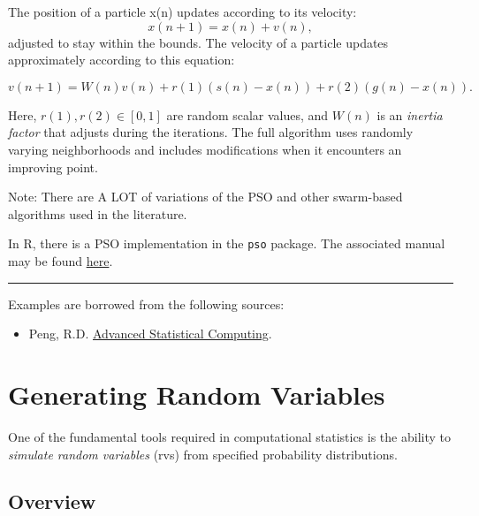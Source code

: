 \documentclass[
  letterpaper,
  DIV=11,
  numbers=noendperiod]{scrreprt}
\providecommand{\tightlist}{%
  \setlength{\itemsep}{0pt}\setlength{\parskip}{0pt}}
\begin{document}
The position of a particle x(n) updates according to its velocity:
\[x(n+1)=x(n)+v(n),\] adjusted to stay within the bounds. The velocity
of a particle updates approximately according to this equation:

\[v(n+1) = W(n)v(n)+r(1)(s(n)−x(n))+r(2)(g(n)−x(n)).\]

Here, \(r(1),r(2) \in [0,1]\) are random scalar values, and \(W(n)\) is
an \emph{inertia factor} that adjusts during the iterations. The full
algorithm uses randomly varying neighborhoods and includes modifications
when it encounters an improving point.

Note: There are A LOT of variations of the PSO and other swarm-based
algorithms used in the literature.

In R, there is a PSO implementation in the \texttt{pso} package. The
associated manual may be found
\href{https://cran.r-project.org/web/packages/pso/pso.pdf}{here}.

\begin{center}\rule{0.5\linewidth}{0.5pt}\end{center}

Examples are borrowed from the following sources:

\begin{itemize}
\tightlist
\item
  Peng, R.D. \href{https://bookdown.org/rdpeng/advstatcomp/}{Advanced
  Statistical Computing}.
\end{itemize}


\chapter{Generating Random Variables}\label{generating-random-variables}

\newcommand{\unif}{\operatorname{Unif}}
\newcommand{\geom}{\operatorname{Geom}}
\newcommand{\beta}{\operatorname{Beta}}
\newcommand{\bern}{\operatorname{Bern}}
\newcommand{\R}{\mathbb{R}}
\newcommand{\iid}{\overset{iid}{\sim}}
\newcommand{\cov}{\mathbb{C}ov}

One of the fundamental tools required in computational statistics is the
ability to \emph{simulate random variables} (rvs) from specified
probability distributions.

\section{Overview}\label{overview}
\end{document}
